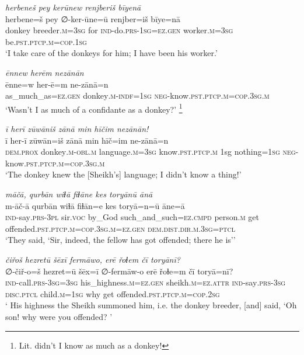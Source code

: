 \ea \label{HB.69}
\textit{herbeneš pey kerūnew renjberiš bīyenā} \\ 
\gll herbene=š pey ∅-ker-ūne=ū renjber=iš bīye=nā \\ 
 donkey breeder\textsc{.m}\textsc{=3sg} for \textsc{ind-}do\textsc{.prs}\textsc{-1sg}\textsc{=ez}\textsc{.gen} worker\textsc{.m}\textsc{=3sg} be\textsc{.pst}\textsc{.ptcp}\textsc{.m}\textsc{=cop}\textsc{.1sg} \\ 
\glt `I take care of the donkeys for him; I have been his worker.'
\z 
 
\ea \label{HB.70}
\textit{ēnnew herēm nezānān} \\ 
\gll ēnne=w her-ē=m ne-zānā=n \\ 
 as\_much\_as\textsc{=ez}\textsc{.gen} donkey\textsc{.m}\textsc{-indf}\textsc{=1sg} \textsc{neg-}know\textsc{.pst}\textsc{.ptcp}\textsc{.m}\textsc{=cop}\textsc{.3sg}\textsc{.m} \\ 
\glt `Wasn’t I as much of a confidante as a donkey?' \footnote{Lit. didn’t I know as much as a donkey!}
\z 
 
\ea \label{HB.71}
\textit{ī herī zūwāniš zānā min hīčim nezānān!} \\ 
\gll ī her-ī zūwān=iš zānā min hīč=im ne-zānā=n \\ 
 \textsc{dem.prox} donkey\textsc{.m}\textsc{-obl}\textsc{.m} language\textsc{.m}\textsc{=3sg} know\textsc{.pst}\textsc{.ptcp}\textsc{.m} 1sg nothing\textsc{=1sg} \textsc{neg-}know\textsc{.pst}\textsc{.ptcp}\textsc{.m}\textsc{=cop}\textsc{.3sg}\textsc{.m} \\ 
\glt `The donkey knew the [Sheikh’s] language; I didn’t know a thing!'
\z 
 
\ea \label{HB.76}
\textit{māčā, qurbān wiɫā fiɫāne kes toryānū ānā} \\ 
\gll m-āč-ā qurbān wiɫā fiɫān=e kes toryā=n=ū āne=ā \\ 
 \textsc{ind-}say\textsc{.prs}\textsc{-3pl} sir.\textsc{voc} by\_God such\_and\_such\textsc{=ez}\textsc{.cmpd} person\textsc{.m} get offended\textsc{.pst}\textsc{.ptcp}\textsc{.m}\textsc{=cop}\textsc{.3sg}\textsc{.m}\textsc{=ez}\textsc{.gen} \textsc{dem.dist}\textsc{.dir}\textsc{.m}\textsc{.3sg}=\textsc{ptcl} \\ 
\glt `They said, ‘Sir, indeed, the fellow has got offended; there he is’'
\z 
 
\ea \label{HB.80}
\textit{čiřoš hezretū šēxī fermāwo, erē řoɫem čī toryānī?} \\ 
\gll ∅-čiř-o=š hezret=ū šēx=ī ∅-fermāw-o erē řoɫe=m čī toryā=nī? \\ 
 \textsc{ind-}call\textsc{.prs}\textsc{-3sg}\textsc{=3sg} his\_highness\textsc{.m}\textsc{=ez}\textsc{.gen} sheikh\textsc{.m}\textsc{=ez}.\textsc{attr} \textsc{ind-}say\textsc{.prs}\textsc{-3sg} \textsc{disc.ptcl} child\textsc{.m}\textsc{=1sg} why get offended\textsc{.pst}\textsc{.ptcp}\textsc{.m}\textsc{=cop}\textsc{.\textsc{2sg}} \\ 
\glt ` His highness the Sheikh summoned him, i.e. the donkey breeder, [and] said, ‘Oh son! why were you offended? '
\z 
 
